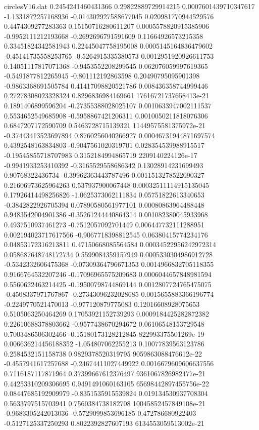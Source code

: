 \begin{filecontents}{circlesV16.dat}
0.2454241460431366	0.29822889729914215	0.0007601439710347617
-1.1331872257168936	-0.014302927588677045	0.020981770944529576
0.4474309277283363	0.15150716280611207	0.0005578820915385906
-0.9952111212193668	-0.2692696791591609	0.11664926573215358
0.33451824342581943	0.22445047758195008	0.0005145164836479602
-0.45141735558253765	-0.5264915335380573	0.0012951920926611753
0.14051117817071368	-0.9453552208299545	0.062076059997619365
-0.5491877812265945	-0.801112192863598	0.20490795095901398
-0.9863368691505784	0.41417098820521786	0.008436358744999446
0.27278308023328324	0.8296836984169661	17616721737658413e-21
0.1891406899596204	-0.27355388028025107	0.0010633947002111537
0.5534652549685908	-0.5958867421206311	0.0010050211818076306
0.6847207172590709	0.5463728715139321	11449575581375972e-21
-0.37443413523697894	0.8760256040266927	0.00046731944871697574
0.4392548163834803	-0.9047561020319701	0.028354539988915517
-0.19545855718707983	0.3152184994865719	2209140224126e-17
-0.9941933253410392	-0.3165529558686342	0.13028914231699493
0.90768322436734	-0.39962363443787496	0.0011513278522090327
0.21606973625964263	0.537937900067448	0.00032511114915135045
0.17926414498256826	-1.0625373062111834	0.05751822613340653
-0.3842822926705394	0.07890580561977101	0.00080863964488448
0.9483542004901386	-0.35261244440864314	0.001082380045933968
0.4937510937461273	-0.7512057092701449	0.006447732111288951
0.002194023717617566	-0.9067718398812545	0.06380415774234176
0.04853172316213811	0.47150668085564584	0.00034522956242972314
0.058687648748172734	0.5599084359157949	0.0005330304986912728
-0.5342332606475368	-0.07309364796671353	0.0014966832705118355
0.9166764532207246	-0.17096965575209683	0.0006044657848981594
0.5560622463214425	-0.19500798744869144	0.0012807724765475075
-0.4508337971767867	-0.27343096232028685	0.0015655883366196774
-0.2249770521470013	-0.977120879775083	0.12016608928075653
0.5105063250464269	0.17053921152739293	0.0009184425282872382
0.22610688378803662	-0.9577438670294672	0.06106548153729548
0.7003486506302466	-0.15180173128212845	822993375501269e-19
0.006636214456188352	-1.054807062255213	0.10077839563123786
0.2584532151158738	0.9829378520319795	9059863088476612e-22
-0.4557941617257688	-0.24674411027449922	0.0016679609606637556
0.7116187117871964	0.37399667612376497	9361067826982477e-21
0.44253310209306695	0.9491491060163105	65698442897455756e-22
0.08447685192909979	-0.8351535915539824	0.019134530937708304
0.5633797515703941	0.7560384738182708	10045852457849108e-21
-0.9683305242013036	-0.5729099853696185	0.472786680922403
-0.5127125337250293	0.8022392827607193	6134553059513002e-21

\end{filecontents}
